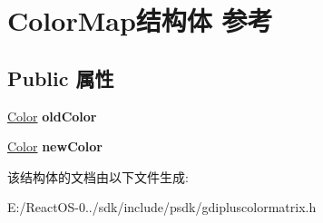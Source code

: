 \hypertarget{struct_color_map}{}\section{Color\+Map结构体 参考}
\label{struct_color_map}
\subsection*{Public 属性}
\begin{DoxyCompactItemize}
\item 
\mbox{\label{struct_color_map_a870a3f362719a528a9f9413d74887e12}} 
\hyperlink{struct_color}{Color} {\bfseries old\+Color}
\item 
\mbox{\label{struct_color_map_aab87f20cfd519fc12a44cff677046496}} 
\hyperlink{struct_color}{Color} {\bfseries new\+Color}
\end{DoxyCompactItemize}


该结构体的文档由以下文件生成\+:\begin{DoxyCompactItemize}
\item 
E\+:/\+React\+O\+S-\/0../sdk/include/psdk/gdipluscolormatrix.\+h\end{DoxyCompactItemize}
